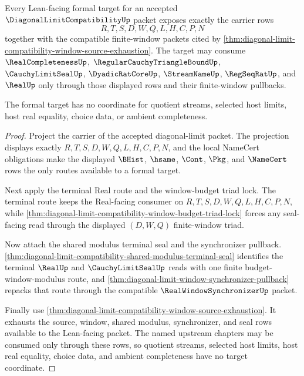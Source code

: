 \begin{theorem}
\label{thm:diagonal-limit-compatibility-formal-target-packet}
Every Lean-facing formal target for an accepted $\DiagonalLimitCompatibilityUp$
packet exposes exactly the carrier rows
$$
R,T,S,D,W,Q,L,H,C,P,N
$$
together with the compatible finite-window packets cited by
\autoref{thm:diagonal-limit-compatibility-window-source-exhaustion}. The
target may consume $\RealCompletenessUp$,
$\RegularCauchyTriangleBoundUp$, $\CauchyLimitSealUp$, $\DyadicRatCoreUp$,
$\StreamNameUp$, $\RegSeqRatUp$, and $\RealUp$ only through those displayed
rows and their finite-window pullbacks.

The formal target has no coordinate for quotient streams, selected host
limits, host real equality, choice data, or ambient completeness.
\end{theorem}
\begin{proof}
Project the carrier of the accepted diagonal-limit packet. The projection
displays exactly $R,T,S,D,W,Q,L,H,C,P,N$, and the local NameCert obligations
make the displayed $\BHist$, $\hsame$, $\Cont$, $\Pkg$, and $\NameCert$ rows
the only routes available to a formal target.

Next apply the terminal Real route and the window-budget triad lock. The
terminal route keeps the Real-facing consumer on $R,T,S,D,W,Q,L,H,C,P,N$, while
\autoref{thm:diagonal-limit-compatibility-window-budget-triad-lock} forces any
seal-facing read through the displayed $(D,W,Q)$ finite-window triad.

Now attach the shared modulus terminal seal and the synchronizer pullback.
\autoref{thm:diagonal-limit-compatibility-shared-modulus-terminal-seal}
identifies the terminal $\RealUp$ and $\CauchyLimitSealUp$ reads with one
finite budget-window-modulus route, and
\autoref{thm:diagonal-limit-window-synchronizer-pullback} repacks that route
through the compatible $\RealWindowSynchronizerUp$ packet.

Finally use
\autoref{thm:diagonal-limit-compatibility-window-source-exhaustion}. It
exhausts the source, window, shared modulus, synchronizer, and seal rows
available to the Lean-facing packet. The named upstream chapters may be
consumed only through these rows, so quotient streams, selected host limits,
host real equality, choice data, and ambient completeness have no target
coordinate.
\end{proof}

